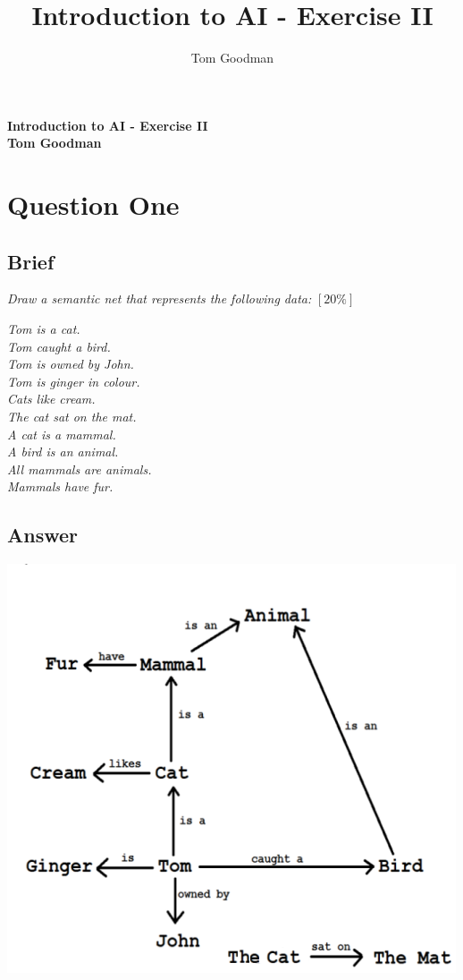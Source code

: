 \documentclass{article}
\title{Introduction to AI - Exercise II}
\author{Tom Goodman}
\date{}
\begin{document}
\begin{titlepage}
	\begin{flushleft}
		\vspace*{1cm}
		\Huge
		\textbf{Introduction to AI - Exercise II} \\
		\vspace*{1cm}
		\Large
		\textbf{Tom Goodman} \\
	\end{flushleft}
\end{titlepage}
\newpage
\section{Question One}
\subsection{Brief}
\textit{Draw a semantic net that represents the following data:} $[20\%]$
\begin{center}
\textit{Tom is a cat. \\
Tom caught a bird. \\ 
Tom is owned by John. \\
Tom is ginger in colour. \\
Cats like cream. \\
The cat sat on the mat. \\
A cat is a mammal. \\ 
A bird is an animal. \\
All mammals are animals. \\
Mammals have fur.}
\end{center}

\subsection{Answer}
\begin{center}
\includegraphics{IntroToAIE2SemanticWeb.png}
\end{center}
\newpage
\end{document}
